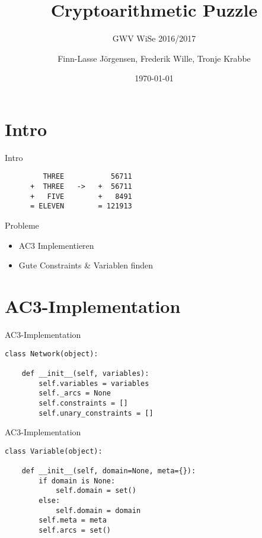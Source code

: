 \documentclass[10pt]{beamer}
\title{Cryptoarithmetic Puzzle}
\subtitle{GWV WiSe 2016/2017}
\date{\today}
\date{}
\author{Finn-Lasse Jörgensen, Frederik Wille, Tronje Krabbe}
\institute{UHH}
\begin{document}
\maketitle


\section{Intro}

\begin{frame}[fragile]{Intro}

\begin{verbatim}
         THREE           56711
      +  THREE   ->   +  56711
      +   FIVE        +   8491
      = ELEVEN        = 121913
\end{verbatim}

\end{frame}

\begin{frame}[fragile]{Probleme}
    \begin{itemize}
        \item AC3 Implementieren
        \item Gute Constraints \& Variablen finden
    \end{itemize}
\end{frame}

\section{AC3-Implementation}

\begin{frame}[fragile]{AC3-Implementation}
    \begin{verbatim}
class Network(object):

    def __init__(self, variables):
        self.variables = variables
        self._arcs = None
        self.constraints = []
        self.unary_constraints = []
    \end{verbatim}
\end{frame}

\begin{frame}[fragile]{AC3-Implementation}
    \begin{verbatim}
class Variable(object):

    def __init__(self, domain=None, meta={}):
        if domain is None:
            self.domain = set()
        else:
            self.domain = domain
        self.meta = meta
        self.arcs = set()
    \end{verbatim}
\end{frame}
\end{document}
